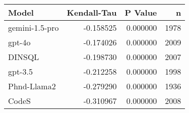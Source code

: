 \begin{tabular}{lrrr}
\toprule
Model & Kendall-Tau & P Value & n \\
\midrule
gemini-1.5-pro & -0.158525 & 0.000000 & 1978 \\
gpt-4o & -0.174026 & 0.000000 & 2009 \\
DINSQL & -0.198730 & 0.000000 & 2007 \\
gpt-3.5 & -0.212258 & 0.000000 & 1998 \\
Phnd-Llama2 & -0.279290 & 0.000000 & 1936 \\
CodeS & -0.310967 & 0.000000 & 2008 \\
\bottomrule
\end{tabular}
